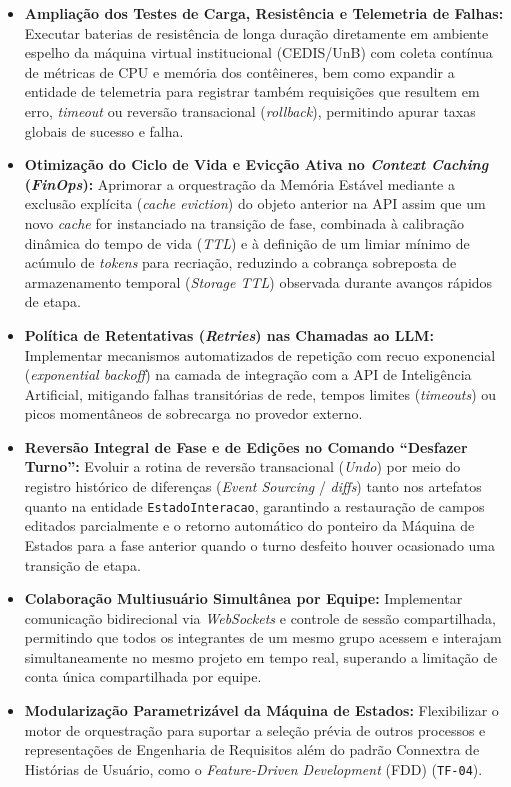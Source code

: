 \begin{itemize}
    \item \textbf{Ampliação dos Testes de Carga, Resistência e Telemetria de Falhas:} Executar baterias de resistência de longa duração diretamente em ambiente espelho da máquina virtual institucional (CEDIS/UnB) com coleta contínua de métricas de CPU e memória dos contêineres, bem como expandir a entidade de telemetria para registrar também requisições que resultem em erro, \textit{timeout} ou reversão transacional (\textit{rollback}), permitindo apurar taxas globais de sucesso e falha.
    \item \textbf{Otimização do Ciclo de Vida e Evicção Ativa no \textit{Context Caching} (\textit{FinOps}):} Aprimorar a orquestração da Memória Estável mediante a exclusão explícita (\textit{cache eviction}) do objeto anterior na API assim que um novo \textit{cache} for instanciado na transição de fase, combinada à calibração dinâmica do tempo de vida (\textit{TTL}) e à definição de um limiar mínimo de acúmulo de \textit{tokens} para recriação, reduzindo a cobrança sobreposta de armazenamento temporal (\textit{Storage TTL}) observada durante avanços rápidos de etapa.
    \item \textbf{Política de Retentativas (\textit{Retries}) nas Chamadas ao LLM:} Implementar mecanismos automatizados de repetição com recuo exponencial (\textit{exponential backoff}) na camada de integração com a API de Inteligência Artificial, mitigando falhas transitórias de rede, tempos limites (\textit{timeouts}) ou picos momentâneos de sobrecarga no provedor externo.
    \item \textbf{Reversão Integral de Fase e de Edições no Comando ``Desfazer Turno'':} Evoluir a rotina de reversão transacional (\textit{Undo}) por meio do registro histórico de diferenças (\textit{Event Sourcing} / \textit{diffs}) tanto nos artefatos quanto na entidade \texttt{Estado\allowbreak Interacao}, garantindo a restauração de campos editados parcialmente e o retorno automático do ponteiro da Máquina de Estados para a fase anterior quando o turno desfeito houver ocasionado uma transição de etapa.
    \item \textbf{Colaboração Multiusuário Simultânea por Equipe:} Implementar comunicação bidirecional via \textit{WebSockets} e controle de sessão compartilhada, permitindo que todos os integrantes de um mesmo grupo acessem e interajam simultaneamente no mesmo projeto em tempo real, superando a limitação de conta única compartilhada por equipe.
    \item \textbf{Modularização Parametrizável da Máquina de Estados:} Flexibilizar o motor de orquestração para suportar a seleção prévia de outros processos e representações de Engenharia de Requisitos além do padrão Connextra de Histórias de Usuário, como o \textit{Feature-Driven Development} (FDD) (\texttt{TF-04}).
\end{itemize}

